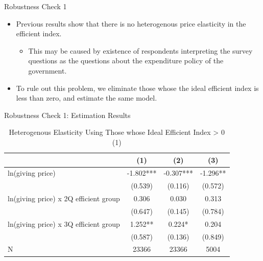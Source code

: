 \documentclass[
  ignorenonframetext,
]{beamer}
\providecommand{\tightlist}{%
  \setlength{\itemsep}{0pt}\setlength{\parskip}{0pt}}
\begin{document}
\begin{frame}{Robustness Check 1}
\protect\hypertarget{robustness-check-1}{}
\begin{itemize}
\tightlist
\item
  Previous results show that there is no heterogenous price elasticity in the efficient index.

  \begin{itemize}
  \tightlist
  \item
    This may be caused by existence of respondents interpreting the survey questions as the questions about the expenditure policy of the government.
  \end{itemize}
\item
  To rule out this problem, we eliminate those whose the ideal efficient index is less than zero, and estimate the same model.
\end{itemize}
\end{frame}

\begin{frame}{Robustness Check 1: Estimation Results}
\protect\hypertarget{robustness-check-1-estimation-results}{}
\begin{table}

\caption{\label{tab:kableSubsetHeteroElasticitySlide1}Heterogenous Elasticity Using Those whose Ideal Efficient Index > 0 (1)}
\centering
\fontsize{8}{10}\selectfont
\begin{tabular}[t]{lccc}
\toprule
 & (1) & (2) & (3)\\
\midrule
ln(giving price) & -1.802*** & -0.307*** & -1.296**\\
 & (0.539) & (0.116) & (0.572)\\
ln(giving price) x 2Q efficient group & 0.306 & 0.030 & 0.313\\
 & (0.647) & (0.145) & (0.784)\\
ln(giving price) x 3Q efficient group & 1.252** & 0.224* & 0.204\\
 & (0.587) & (0.136) & (0.849)\\
N & 23366 & 23366 & 5004\\
\bottomrule
\end{tabular}
\end{table}
\end{frame}
\end{document}

